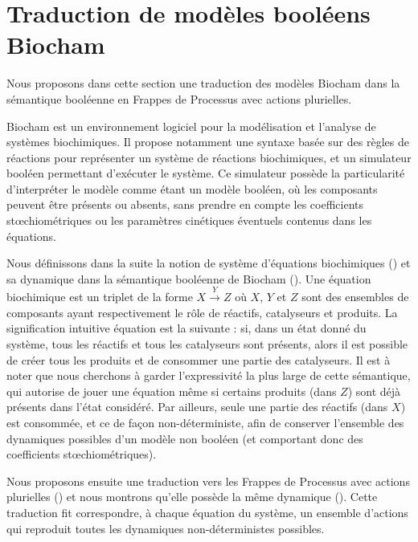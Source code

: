 
\section{Traduction de modèles booléens Biocham}

Nous proposons dans cette section une traduction des modèles Biocham dans la sémantique booléenne
en Frappes de Processus avec actions plurielles.

\myskip

Biocham 
est un environnement logiciel pour la modélisation et l'analyse de systèmes biochimiques.
Il propose notamment une syntaxe basée sur des règles de réactions pour représenter
un système de réactions biochimiques,
et un simulateur booléen permettant d'exécuter le système.
Ce simulateur possède la particularité d'interpréter le modèle comme étant un modèle booléen,
où les composants peuvent être présents ou absents,
sans prendre en compte les coefficients stœchiométriques ou les paramètres cinétiques
éventuels contenus dans les équations.

Nous définissons dans la suite la notion de système d'équations biochimiques ()
et sa dynamique dans la sémantique booléenne de Biocham ().
Une équation biochimique est un triplet de la forme $X \xrightarrow{Y} Z$
où $X$, $Y$ et $Z$ sont des ensembles de composants ayant respectivement le rôle
de réactifs, catalyseurs et produits.
La signification intuitive équation est la suivante :
si, dans un état donné du système, tous les réactifs et tous les catalyseurs sont présents,
alors il est possible de créer tous les produits et de consommer une partie des catalyseurs.
Il est à noter que nous cherchons à garder l'expressivité la plus large de cette sémantique,
qui autorise de jouer une équation même si certains produits (dans $Z$) sont déjà présents
dans l'état considéré.
Par ailleurs, seule une partie des réactifs (dans $X$) est consommée, et ce de façon
non-déterministe, afin de conserver l'ensemble des dynamiques possibles d'un modèle non booléen
(et comportant donc des coefficients stœchiométriques).

Nous proposons ensuite une traduction vers les Frappes de Processus avec actions plurielles
()
et nous montrons qu'elle possède la même dynamique ().
Cette traduction fit correspondre, à chaque équation du système,
un ensemble d'actions qui reproduit toutes les dynamiques non-déterministes possibles.

